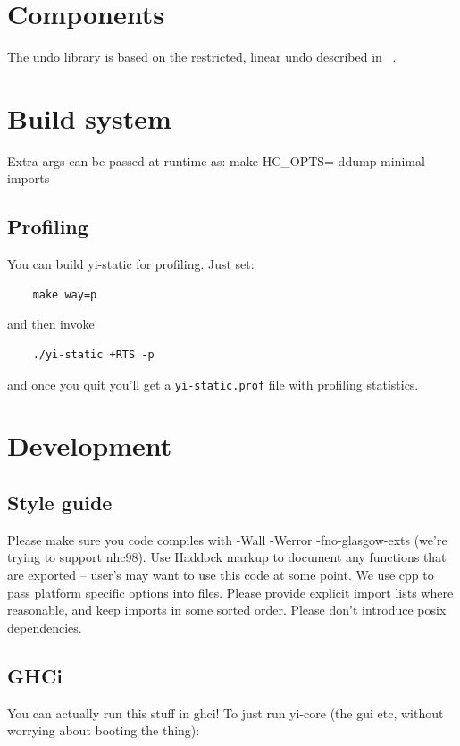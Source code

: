 \documentclass[]{article}
\newcommand{\code}[1]{\texttt{#1}}
\begin{document}
\section{Components}

The undo library is based on the restricted, linear undo described in
~\cite{berlage94selective}.

\section{Build system}

Extra args can be passed at runtime as: make HC\_OPTS=-ddump-minimal-imports

\subsection{Profiling}

You can build yi-static for profiling. Just set:
\begin{verbatim}
    make way=p
\end{verbatim}
and then invoke
\begin{verbatim}
    ./yi-static +RTS -p
\end{verbatim}
and once you quit you'll get a \code{yi-static.prof} file with profiling
statistics.

\section{Development}

\subsection{Style guide}

Please make sure you code compiles with -Wall -Werror -fno-glasgow-exts
(we're trying to support nhc98). Use Haddock markup to document any
functions that are exported -- user's may want to use this code at some
point. We use cpp to pass platform specific options into files. Please
provide explicit import lists where reasonable, and keep imports in some
sorted order. Please don't introduce posix dependencies.

\subsection{GHCi}

You can actually run this stuff in ghci! To just run yi-core (the gui
etc, without worrying about booting the thing):
\end{document}
